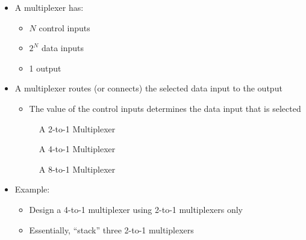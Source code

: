 \begin{itemize}

  \item A multiplexer has:

    \begin{itemize}

      \item $N$ control inputs

      \item $2^N$ data inputs

      \item 1 output

    \end{itemize}

  \item A multiplexer routes (or connects) the selected data input to the output

    \begin{itemize}

      \item The value of the control inputs determines the data input that is selected

    \end{itemize}

    \begin{figure}[h!]
      \centering
      
      \caption{A 2-to-1 Multiplexer}
      \label{fig:1}
    \end{figure}

    \begin{figure}[h!]
      \centering
      
      \caption{A 4-to-1 Multiplexer}
      \label{fig:2}
    \end{figure}

    \begin{figure}[h!]
      \centering
      
      \caption{A 8-to-1 Multiplexer}
      \label{fig:3}
    \end{figure}

  \item Example:

    \begin{itemize}

      \item Design a 4-to-1 multiplexer using 2-to-1 multiplexers only

      \item Essentially, ``stack'' three 2-to-1 multiplexers 

    \end{itemize}

\end{itemize}



